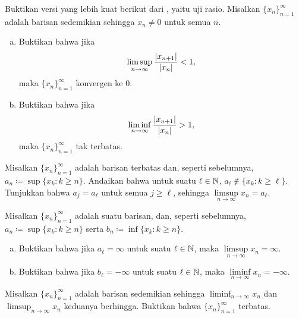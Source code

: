 \begin{exercise} \label{exercise:strongerratiotest2}
Buktikan versi yang lebih kuat berikut dari , yaitu uji
rasio.
Misalkan $\{ x_n \}_{n=1}^\infty$ adalah barisan sedemikian sehingga $x_n \neq 0$ untuk semua
$n$.
\begin{enumerate}[a)]
\item
Buktikan bahwa jika
\begin{equation*}
\limsup_{n \to \infty} \frac{\lvert {x_{n+1}} \rvert}{\lvert {x_n} \rvert} < 1 ,
\end{equation*}
maka $\{ x_n \}_{n=1}^\infty$ konvergen ke $0$.
\item
Buktikan bahwa jika
\begin{equation*}
\liminf_{n \to \infty} \frac{\lvert {x_{n+1}} \rvert}{\lvert {x_n} \rvert} > 1 ,
\end{equation*}
maka $\{ x_n \}_{n=1}^\infty$ tak terbatas.
\end{enumerate}
\end{exercise}

\begin{exercise}
Misalkan $\{ x_n \}_{n=1}^\infty$ adalah barisan terbatas dan, seperti sebelumnya, $a_n \coloneqq \sup \{ x_k : k \geq n \}$.
Andaikan bahwa untuk suatu $\ell \in {\mathbb{N}}$,
$a_\ell \notin \{ x_k : k \geq \ell \}$.  Tunjukkan bahwa $a_j = a_\ell$ untuk semua $j \geq \ell$, sehingga
$\limsup\limits_{n\to\infty} x_n = a_\ell$.
\end{exercise}

\begin{exercise}
Misalkan $\{ x_n \}_{n=1}^\infty$ adalah suatu barisan,
dan, seperti sebelumnya, $a_n \coloneqq \sup \{ x_k : k \geq n \}$ serta
$b_n \coloneqq \inf \{ x_k : k \geq n \}$.
\begin{enumerate}[a)]
\item
Buktikan bahwa jika $a_\ell = \infty$ untuk suatu $\ell \in {\mathbb{N}}$, maka 
$\limsup\limits_{n\to\infty} x_n = \infty$.
\item
Buktikan bahwa jika $b_\ell = -\infty$ untuk suatu $\ell \in {\mathbb{N}}$, maka 
$\liminf\limits_{n\to\infty} x_n = -\infty$.
\end{enumerate}
\end{exercise}

\begin{exercise}
Misalkan $\{ x_n \}_{n=1}^\infty$ adalah barisan
sedemikian sehingga $\liminf_{n\to\infty} x_n$ dan
$\limsup_{n\to\infty} x_n$ keduanya berhingga.  Buktikan bahwa $\{ x_n \}_{n=1}^\infty$ terbatas.
\end{exercise}

